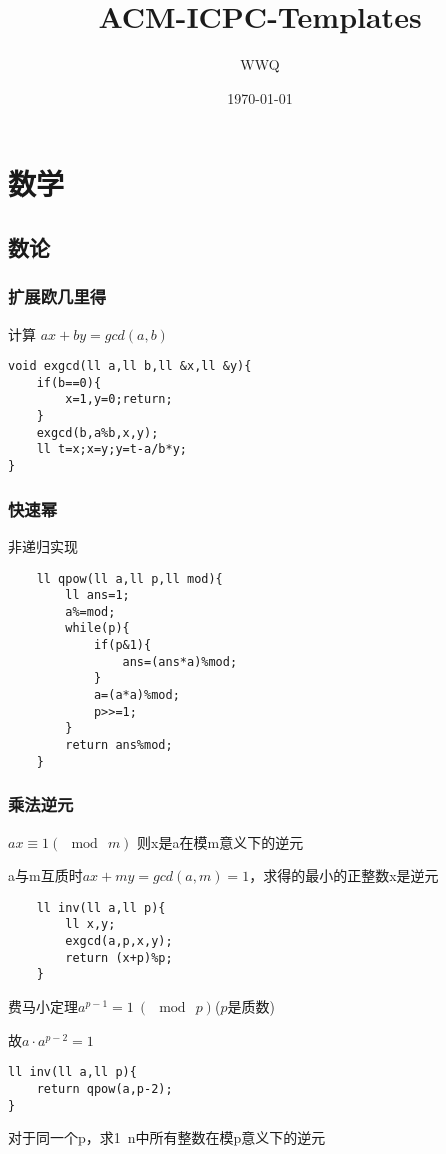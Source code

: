 \documentclass[UTF8]{ctexart}
\title{ACM-ICPC-Templates}
\author{WWQ}
\date{\today}
\begin{document}
\begin{titlepage}
\maketitle
\thispagestyle{empty}
\end{titlepage}

\tableofcontents
\thispagestyle{empty}
\newpage

\setcounter{page}{1}
\section{数学}
\subsection{数论}
\subsubsection{扩展欧几里得}
计算 $ax+by=gcd(a,b)$
\begin{lstlisting}
void exgcd(ll a,ll b,ll &x,ll &y){
	if(b==0){
	    x=1,y=0;return;
	}
	exgcd(b,a%b,x,y);
	ll t=x;x=y;y=t-a/b*y;
}
\end{lstlisting}
\subsubsection{快速幂}
非递归实现
\begin{lstlisting}
    ll qpow(ll a,ll p,ll mod){
        ll ans=1;
        a%=mod;
        while(p){
            if(p&1){
                ans=(ans*a)%mod;
            }
            a=(a*a)%mod;
            p>>=1;
        }
        return ans%mod;
    }
\end{lstlisting}
\subsubsection{乘法逆元}
$ax\equiv1(\mod\ m)$ 则x是a在模m意义下的逆元

a与m互质时$ax+my=gcd(a,m)=1$，求得的最小的正整数x是逆元
\begin{lstlisting}
    ll inv(ll a,ll p){
        ll x,y;
        exgcd(a,p,x,y);
        return (x+p)%p;
    } 
\end{lstlisting}

费马小定理$a^{p-1}=1\ (\mod\ p)$($p$是质数)

故$a\cdot a^{p-2}=1$
\begin{lstlisting}
ll inv(ll a,ll p){
    return qpow(a,p-2);
}
\end{lstlisting}
对于同一个p，求1~n中所有整数在模p意义下的逆元
\end{document}
